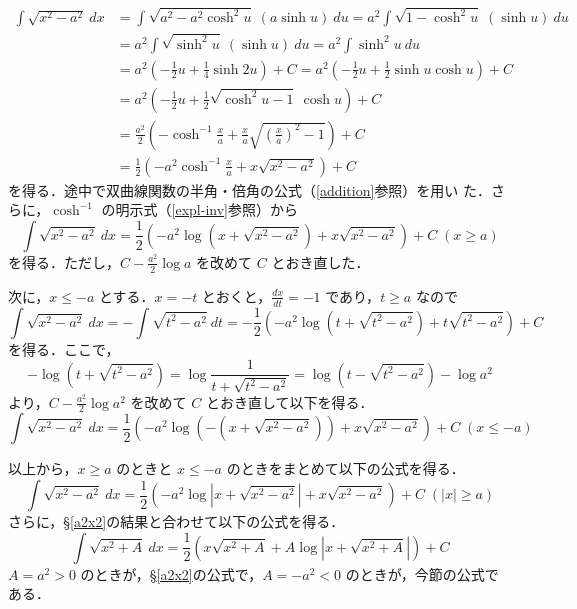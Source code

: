 \documentclass[dvipdfmx,12pt, uplatex]{jsarticle}
\begin{document}
\begin{align*}
  \int \sqrt{x^2-a^2} \ dx &= \int \sqrt{a^2 - a^2 \cosh^2 u} \ \left( a \sinh u \right) \ du
  = a^2 \int \sqrt{1-\cosh^2 u} \; (\sinh u ) \ du\\
                           &= a^2 \int \sqrt{\sinh^2 u} \ (\sinh u ) \ du
                             = a^2 \int \sinh^2 u \ du\\
                           &= a^2 \left( -\frac{1}{2}u+\frac{1}{4} \sinh 2u\right)+C
                             =a^2\left( -\frac{1}{2} u + \frac{1}{2} \sinh u \cosh u\right) +C\\
                           &= a^2\left( -\frac{1}{2} u + \frac{1}{2} \sqrt{\cosh^2 u -1} \ \cosh u \right) +C\\
                           &=\frac{a^2}{2} \left( -\cosh^{-1} \frac{x}{a}  
                             + \frac{x}{a} \sqrt{\left(\frac{x}{a}\right)^2-1} \right) +C\\
                           &= \frac{1}{2} \left( -a^2 \cosh^{-1} \frac{x}{a} + x \sqrt{x^2-a^2}\right)+C
\end{align*}
を得る．途中で双曲線関数の半角・倍角の公式（\ref{addition}参照）を用い
た．さらに，$\cosh^{-1}$ の明示式（\ref{expl-inv}参照）から
\[
  \int \sqrt{x^2-a^2} \ dx=\frac{1}{2} \left( -a^2 \log \left( x+ \sqrt{x^2-a^2} \right)+ x\sqrt{x^2-a^2}\right)+C \;
  (x \geq a)
\]
を得る．ただし，$C-\frac{a^2}{2} \log a$ を改めて $C$ とおき直した．


次に，$x \leq -a$ とする．$x=-t$ とおくと，$\frac{dx}{dt} = -1$ であり，$t \geq a$ なので
\[
  \int \sqrt{x^2-a^2} \ dx = -\int \sqrt{t^2-a^2} \ dt = -\frac{1}{2} \left( -a^2 \log \left( t+\sqrt{t^2-a^2} \right)
    + t \sqrt{t^2-a^2} \right)+C
\]
を得る．ここで，
\[
  -\log\left( t+\sqrt{t^2-a^2}\right) = \log \frac{1}{t+\sqrt{t^2-a^2}} 
  = \log \left( t - \sqrt{ t^2-a^2}\right) - \log a^2
\]
より，$C-\frac{a^2}{2}\log a^2$ を改めて $C$ とおき直して以下を得る．
\[
  \int \sqrt{x^2-a^2} \ dx = \frac{1}{2}\left( -a^2 \log \left( -\left(x + \sqrt{x^2-a^2}\right)\right) 
        + x\sqrt{x^2-a^2}\right)+C \; (x \leq -a)
\]

以上から，$x \geq a$ のときと $x \leq -a$ のときをまとめて以下の公式を得る．
\[
  \int \sqrt{x^2-a^2} \ dx = \frac{1}{2} \left( -a^2 \log \left| x + \sqrt{x^2-a^2}\right| + x\sqrt{x^2-a^2}\right) +C
  \; \left( \left|x \right| \geq a \right)
\]
さらに，\S\ref{a2x2}の結果と合わせて以下の公式を得る．
\[
  \int \sqrt{x^2 +A} \ dx = \frac{1}{2} \left( x \sqrt{x^2 +A} + 
    A \log \left| x + \sqrt{ x^2 + A} \right| \right) +C
\]
$A=a^2>0$ のときが，\S\ref{a2x2}の公式で，$A=-a^2<0$ のときが，今節の公式である．
\end{document}
